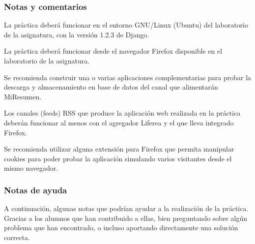 \subsubsection{Notas y comentarios}

La práctica deberá funcionar en el entorno GNU/Linux (Ubuntu) del laboratorio de la asignatura, con la versión 1.2.3 de Django.

La práctica deberá funcionar desde el navegador Firefox disponible en el laboratorio de la asignatura.

Se recomienda construir una o varias aplicaciones complementarias para probar la descarga y almacenamiento en base de datos del canal que alimentarán MiResumen.

Los canales (feeds) RSS que produce la aplicación web realizada en la práctica deberán funcionar al menos con el agregador Liferea y el que lleva integrado Firefox.

Se recomienda utilizar alguna extensión para Firefox que permita manipular cookies para poder probar la aplicación simulando varios visitantes desde el mismo navegador.

\subsubsection{Notas de ayuda}

A continuación, algunas notas que podrían ayudar a la realización de la práctica. Gracias a los alumnos que han contribuido a ellas, bien preguntando sobre algún problema que han encontrado, o incluso aportando directamente una solución correcta.

